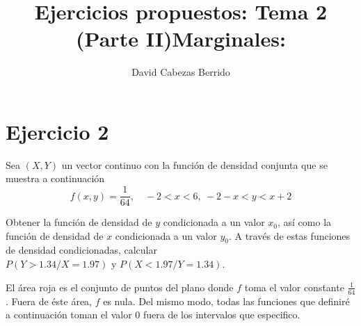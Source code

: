 \documentclass[tikz]{article}
\begin{document}
\title{Ejercicios propuestos: Tema 2 (Parte II)}
\author{David Cabezas Berrido}
\date{}
\maketitle

\section*{Ejercicio 2}

Sea $(X,Y)$ un vector continuo con la función de densidad conjunta que
se muestra a continuación
\[f(x,y)=\frac{1}{64}, \quad -2<x<6,\ -2-x<y<x+2\]

Obtener la función de densidad de $y$ condicionada a un valor $x_0$,
así como la función de densidad de $x$ condicionada a un valor
$y_0$. A través de estas funciones de densidad condicionadas, calcular
\\ $P(Y>1.34/X=1.97)$ y $P(X<1.97/Y=1.34)$.

\vspace{7mm}

El área roja es el conjunto de puntos del plano donde $f$ toma el
valor constante $\frac{1}{64}$. Fuera de éste área, $f$ es nula. Del
mismo modo, todas las funciones que definiré a continuación toman el
valor 0 fuera de los intervalos que especifico.

\begin{center}
\end{center}

\newpage

\title{\large \textbf{Marginales:}} \\
\end{document}

